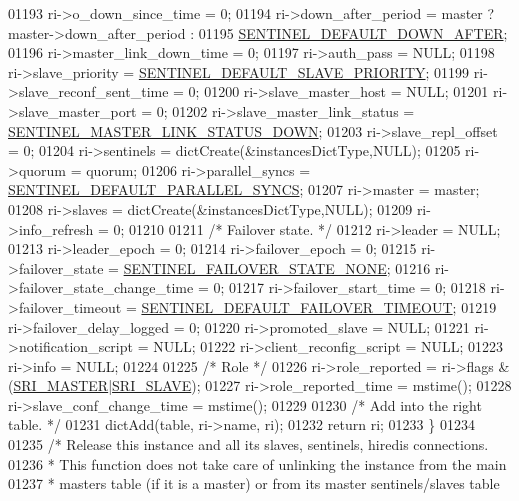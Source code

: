 \begin{DoxyCode}
{{{{{{{{{{{{{{{{01193     ri->o\_down\_since\_time = 0;
01194     ri->down\_after\_period = master ? master->down\_after\_period :
01195                             \hyperlink{sentinel_8c_a8d75144bfd53c71ce519a97de5016857}{SENTINEL\_DEFAULT\_DOWN\_AFTER};
01196     ri->master\_link\_down\_time = 0;
01197     ri->auth\_pass = NULL;
01198     ri->slave\_priority = \hyperlink{sentinel_8c_ac0c5ae92e4f8b5f76ff6c31ed7ffe254}{SENTINEL\_DEFAULT\_SLAVE\_PRIORITY};
01199     ri->slave\_reconf\_sent\_time = 0;
01200     ri->slave\_master\_host = NULL;
01201     ri->slave\_master\_port = 0;
01202     ri->slave\_master\_link\_status = \hyperlink{sentinel_8c_af4e90431bc568a5b3be300ecebc064d6}{SENTINEL\_MASTER\_LINK\_STATUS\_DOWN};
01203     ri->slave\_repl\_offset = 0;
01204     ri->sentinels = dictCreate(&instancesDictType,NULL);
01205     ri->quorum = quorum;
01206     ri->parallel\_syncs = \hyperlink{sentinel_8c_a7cfe6cf48e367486681eb21e53c65dc9}{SENTINEL\_DEFAULT\_PARALLEL\_SYNCS};
01207     ri->master = master;
01208     ri->slaves = dictCreate(&instancesDictType,NULL);
01209     ri->info\_refresh = 0;
01210 
01211     \textcolor{comment}{/* Failover state. */}
01212     ri->leader = NULL;
01213     ri->leader\_epoch = 0;
01214     ri->failover\_epoch = 0;
01215     ri->failover\_state = \hyperlink{sentinel_8c_a23bad5aa23e7b1a930ad4aa535938efb}{SENTINEL\_FAILOVER\_STATE\_NONE};
01216     ri->failover\_state\_change\_time = 0;
01217     ri->failover\_start\_time = 0;
01218     ri->failover\_timeout = \hyperlink{sentinel_8c_a562b5124572b4d837a34b98c41ef391d}{SENTINEL\_DEFAULT\_FAILOVER\_TIMEOUT};
01219     ri->failover\_delay\_logged = 0;
01220     ri->promoted\_slave = NULL;
01221     ri->notification\_script = NULL;
01222     ri->client\_reconfig\_script = NULL;
01223     ri->info = NULL;
01224 
01225     \textcolor{comment}{/* Role */}
01226     ri->role\_reported = ri->flags & (\hyperlink{sentinel_8c_a2ee83e5ff67b45746cd6a310f15334b2}{SRI\_MASTER}|\hyperlink{sentinel_8c_a4b9db21eda79d49bd9fdf2cf7b3178e8}{SRI\_SLAVE});
01227     ri->role\_reported\_time = mstime();
01228     ri->slave\_conf\_change\_time = mstime();
01229 
01230     \textcolor{comment}{/* Add into the right table. */}
01231     dictAdd(table, ri->name, ri);
01232     \textcolor{keywordflow}{return} ri;
01233 \}
01234 
01235 \textcolor{comment}{/* Release this instance and all its slaves, sentinels, hiredis connections.}
01236 \textcolor{comment}{ * This function does not take care of unlinking the instance from the main}
01237 \textcolor{comment}{ * masters table (if it is a master) or from its master sentinels/slaves table}
}}}}}}}}}}}}}}}}
\end{DoxyCode}
